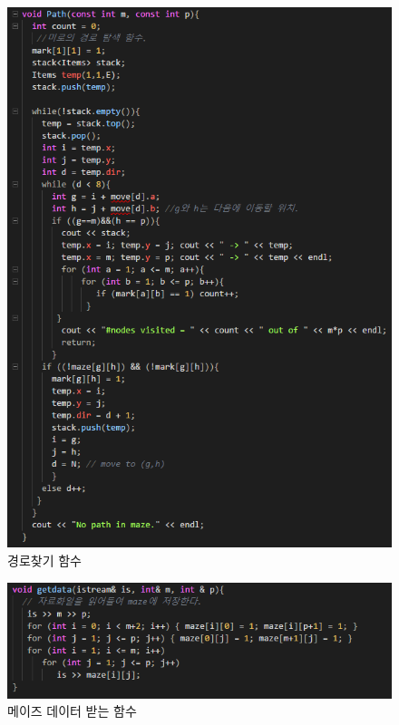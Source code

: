 \documentclass[a4paper,12pt]{article}
\begin{document}
\begin{figure}[t]\vspace*{4pt} 
\centerline{\includegraphics[width=1.0\columnwidth]{maze3}} 
\caption{경로찾기 함수}\vspace*{-6pt} 
\label{figure:matrixb_overload} 
\end{figure} 

\begin{figure}[t]\vspace*{4pt} 
    \centerline{\includegraphics[width=1.0\columnwidth]{maze4}} 
    \caption{메이즈 데이터 받는 함수}\vspace*{-6pt} 
    \label{figure:matrixb_overload} 
    \end{figure} 
    
\end{document}
